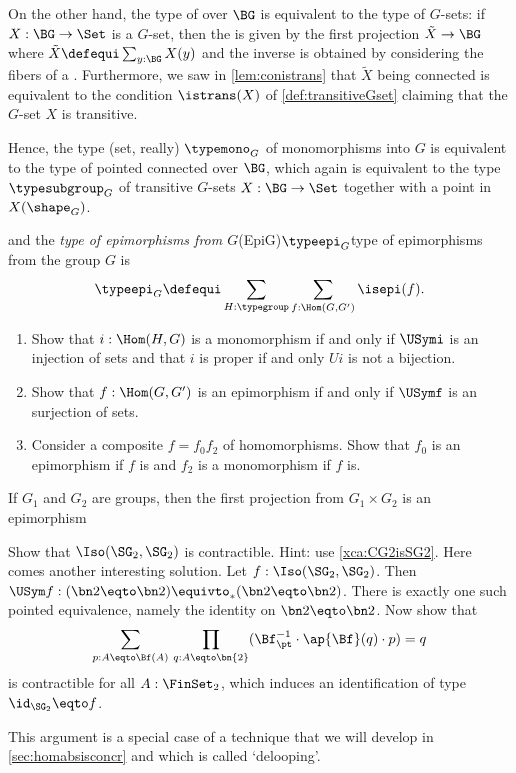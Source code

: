 On the other hand,  the type of \coverings over $\BG$ is equivalent to the type of $G$-sets: if $X:\BG\to\Set$ is a $G$-set, then the \covering is given by the first projection $\tilde X\to \BG$ where $\tilde X\defequi\sum_{y:\BG}X(y)$ and the inverse is obtained by considering the fibers of a \covering.  Furthermore, we saw in \cref{lem:conistrans} that $\tilde X$ being connected is equivalent to the condition $\istrans(X)$ of \cref{def:transitiveGset} claiming that the $G$-set $X$ is transitive.

Hence, the type (set, really) $\typemono_G$ of monomorphisms into $G$ is equivalent to the type of pointed connected \coverings over $\BG$, which again is equivalent to the type $\typesubgroup_G$ of transitive $G$-sets $X:\BG\to\Set$ together with a point in $X(\shape_G)$.

and the \emph{type of epimorphisms from $G$}\glossary(EpiG){$\protect{\typeepi_G}$}{type of epimorphisms from the group $G$} is
  $$\typeepi_G\defequi\sum_{H:\typegroup}\sum_{f:\Hom(G,G')}\isepi(f).$$
  
  
  \begin{exercise}
      \begin{enumerate}
      \item Show that $i:\Hom(H,G)$ is a monomorphism if and only if $\USymi$ is an injection of sets and that $i$ is proper if and only $Ui$ is not a bijection.
      \item Show that $f:\Hom(G,G')$ is an epimorphism if and only if $\USymf$ is an surjection of sets.
      \item Consider a composite $f=f_0f_2$ of homomorphisms.  Show that $f_0$ is an epimorphism if $f$ is and $f_2$ is a monomorphism if $f$ is.\qedhere
      \end{enumerate}
    \end{exercise}
    
    If $G_1$ and $G_2$ are groups, then the first projection from $G_1\times G_2$ is an epimorphism 

\begin{xca}
  \label{xca:SG2=SG2contractible} 
  Show that $\Iso(\SG_2,\SG_2)$ is contractible. Hint: use
  \cref{xca:CG2isSG2}. Here comes another interesting solution.
  Let $f:\Iso(\SG_2,\SG_2)$. Then $\USym f: (\bn2\eqto\bn2)\equivto_*
  (\bn2\eqto\bn2)$. There is exactly one such pointed equivalence,
  namely the identity on $\bn2\eqto\bn2$. Now show that 
  \[
  \sum_{p:A\eqto \Bf(A)}\,\prod_{q: A\eqto\bn{2}} 
  (\Bf^{-1}_\pt\cdot \ap{\Bf}(q)\cdot p) = q
  \]
  is contractible for all $A:\FinSet_2$, which induces an
  identification of type $\id_{\SG_2}\eqto f$.
  
  This argument is a special case of a technique that we
  will develop in \cref{sec:homabsisconcr} and which is called `delooping'.
\end{xca}


